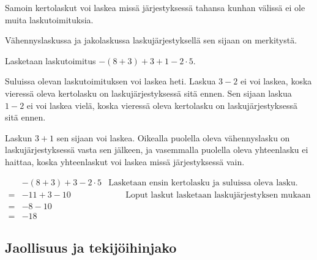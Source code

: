 Samoin kertolaskut voi laskea missä järjestyksessä tahansa kunhan välissä ei ole muita laskutoimituksia.

Vähennyslaskussa ja jakolaskussa laskujärjestyksellä sen sijaan on merkitystä.

\begin{esimerkki}
Lasketaan laskutoimitus $-(8+3)+3+1-2\cdot 5$.

Suluissa olevan laskutoimituksen voi laskea heti. Laskua $3-2$ ei voi laskea, koska
vieressä oleva kertolasku on laskujärjestyksessä sitä ennen. Sen sijaan laskua $1-2$ ei voi laskea vielä,
koska vieressä oleva kertolasku on laskujärjestyksessä sitä ennen.

Laskun $3+1$ sen sijaan voi laskea. Oikealla puolella oleva vähennyslasku on
laskujärjestyksessä vasta sen jälkeen, ja vasemmalla puolella oleva yhteenlasku ei haittaa,
koska yhteenlaskut voi laskea missä järjestyksessä vain.

\begin{align*}
   &-(8+3)+3-2\cdot 5&\textrm{Lasketaan ensin kertolasku ja suluissa oleva lasku.}
\\=&-11+3-10&\qquad\textrm{Loput laskut lasketaan laskujärjestyksen mukaan vasemmalta oikealle.}
\\=&-8-10&
\\=&-18&
\end{align*}
\end{esimerkki}

\subsection*{Jaollisuus ja tekijöihinjako}

    
\begin{esimerkki}
	\begin{alakohdat}
	\end{alakohdat}
\end{esimerkki}
   
